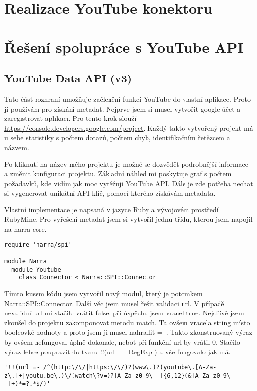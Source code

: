 \section{Realizace YouTube konektoru}
\section{Řešení spolupráce s YouTube API}
\subsection{YouTube Data API (v3)}
\par Tato část rozhraní umožňuje začlenění funkcí YouTube do vlastní aplikace. Proto jí používám pro získání metadat. Nejprve jsem si musel vytvořit google účet a zaregistrovat aplikaci. Pro tento krok slouží \url{https://console.developers.google.com/project}. Každý takto vytvořený projekt má u sebe statistiky s počtem dotazů, počtem chyb, identifikačním řetězcem a názvem. 
\par Po kliknutí na název mého projektu je možné se dozvědět podrobnější informace a změnit konfiguraci projektu. Základní náhled mi poskytuje graf s počtem požadavků, kde vidím jak moc vytěžuji YouTube API. Dále je zde potřeba nechat si vygenerovat unikátní API klíč, pomocí kterého získávám metadata.
\par Vlastní implementace je napsaná v jazyce Ruby a vývojovém prostředí RubyMine. Pro vyřešení metadat jsem si vytvořil jednu třídu, kterou jsem napojil na narra-core. 
\begin{verbatim}
require 'narra/spi'

module Narra
  module Youtube
    class Connector < Narra::SPI::Connector
\end{verbatim}
\par Tímto kusem kódu jsem vytvořil nový modul, který je potomkem Narra::SPI::Connector. Další věc jsem musel řešit validaci url. V případě nevalidní url mi stačilo vrátit false, při úspěchu jsem vracel true. Nejdřívě jsem zkoušel do projektu zakomponovat metodu match. Ta ovšem vracela string místo booleovké hodnoty a proto jsem ji musel nahradit =~. Takto zkonstruovaný výraz by ovšem nefungoval úplně dokonale, neboť při funkční url by vrátil 0. Stačilo výraz lehce poupravit do tvaru !!(url =~ RegExp ) a vše fungovalo jak má.
\begin{verbatim}
'!!(url =~ /^(http:\/\/|https:\/\/)?(www\.)?(youtube\.[A-Za-z\.]+|youtu.be\.)\/(watch\?v=)?[A-Za-z0-9\-_]{6,12}(&[A-Za-z0-9\-_]+)*=?.*$/)'
\end{verbatim}

